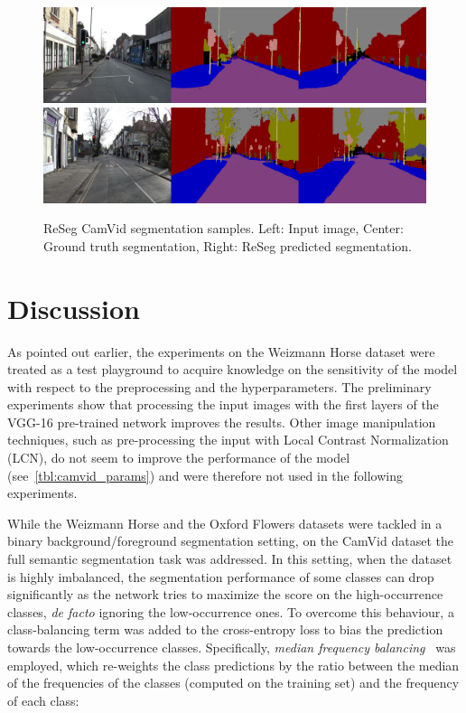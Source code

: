 \begin{figure}[t!]
    \centering
    \includegraphics[width=\textwidth]{img/reseg/samples/camvid1.png}\\
    \vspace{0.1em}
    \includegraphics[width=\textwidth]{img/reseg/samples/camvid2.png}
    \caption{ReSeg CamVid segmentation samples.
        Left: Input image, Center: Ground truth segmentation,
        Right: ReSeg predicted segmentation.}
    \label{fig:reseg_samples_camvid}
\end{figure}


\section{Discussion}

As pointed out earlier, the experiments on the Weizmann Horse dataset were
treated as a test playground to acquire knowledge on the sensitivity of the
model with respect to the preprocessing and the hyperparameters. The
preliminary experiments show that processing the input images with the first
layers of the VGG-16 pre-trained network improves the results. Other image
manipulation techniques, such as pre-processing the input with Local Contrast
Normalization (LCN), do not seem to improve the performance of the model
(see~\autoref{tbl:camvid_params}) and were therefore not used in the following
experiments.

While the Weizmann Horse and the Oxford Flowers datasets were tackled in a
binary background/foreground segmentation setting, on the CamVid dataset the
full semantic segmentation task was addressed. In this setting, when the
dataset is highly imbalanced, the segmentation performance of some classes can
drop significantly as the network tries to maximize the score on the
high-occurrence classes, {\em de facto} ignoring the low-occurrence ones. To
overcome this behaviour, a class-balancing term was added to the cross-entropy
loss to bias the prediction towards the low-occurrence classes. Specifically,
\emph{median frequency balancing}~\cite{Eigen2015,eigen2015predicting} was
employed, which re-weights the class predictions by the ratio between the
median of the frequencies of the classes (computed on the training set) and the
frequency of each class:

